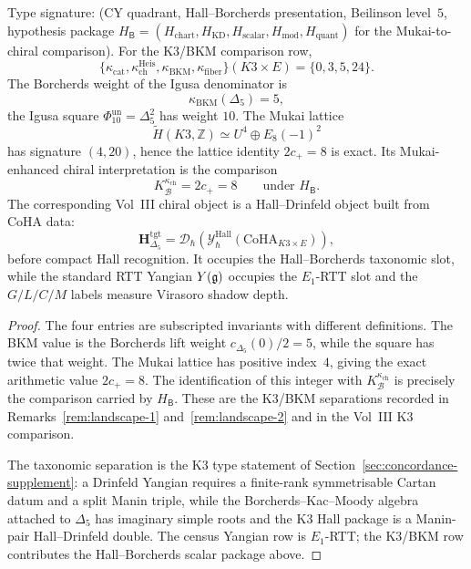\begin{proposition}
\label{prop:uc-K3-BKM-scalar-separation}
\ClaimStatusConditional
Type signature: \textup{(}CY quadrant, Hall--Borcherds presentation,
Beilinson level~$5$, hypothesis package
$H_{\mathsf B}=(H_{\mathrm{chart}},H_{\mathrm{KD}},H_{\mathrm{scalar}},
H_{\mathrm{mod}},H_{\mathrm{quant}})$ for the Mukai-to-chiral
comparison\textup{)}.
For the K3/BKM comparison row,
\[
\{\kappa_{\mathrm{cat}},
\kappa_{\mathrm{ch}}^{\mathrm{Heis}},
\kappa_{\mathrm{BKM}},
\kappa_{\mathrm{fiber}}\}(K3\times E)
=\{0,3,5,24\}.
\]
The Borcherds weight of the Igusa denominator is
\[
 \kappa_{\mathrm{BKM}}(\Delta_5)=5,
\]
the Igusa square $\Phi_{10}^{\mathrm{un}}=\Delta_5^2$ has weight
$10$.  The Mukai lattice
\[
\widetilde H(K3,\mathbb Z)\simeq U^4\oplus E_8(-1)^2
\]
has signature $(4,20)$, hence the lattice identity $2c_+=8$ is exact.
Its Mukai-enhanced chiral interpretation is the
\ClaimStatusConjectured{} comparison
\[
 K^{\kappa_{\mathrm{ch}}}_{\mathcal B}=2c_+=8
 \qquad\text{under }H_{\mathsf B}.
\]
The corresponding Vol~III chiral object is a Hall--Drinfeld object
built from CoHA data:
\[
 \mathbf H_{\Delta_5}^{\mathrm{tgt}}
 =
 \mathcal D_\hbar\!\left(
 \mathcal Y^{\mathrm{Hall}}_\hbar(\mathrm{CoHA}_{K3\times E})
 \right),
\]
before compact Hall recognition. It occupies the Hall--Borcherds
taxonomic slot, while the standard RTT Yangian $Y(\mathfrak{g})$ occupies the
$E_1$-RTT slot and the $G/L/C/M$ labels measure Virasoro shadow depth.
\end{proposition}

\begin{proof}
The four entries are subscripted invariants with different
definitions. The BKM value is the Borcherds lift weight
$c_{\Delta_5}(0)/2=5$, while the square has twice that weight. The
Mukai lattice has positive index~$4$, giving the exact arithmetic value
$2c_+=8$.  The identification of this integer with
$K^{\kappa_{\mathrm{ch}}}_{\mathcal B}$ is precisely the comparison
carried by $H_{\mathsf B}$.  These are the K3/BKM separations recorded in
Remarks~\ref{rem:landscape-1} and~\ref{rem:landscape-2} and in the
Vol~III K3 comparison.

The taxonomic separation is the K3 type statement of
Section~\ref{sec:concordance-supplement}: a Drinfeld Yangian requires a
finite-rank symmetrisable Cartan datum and a split Manin triple, while
the Borcherds--Kac--Moody algebra attached to $\Delta_5$ has imaginary
simple roots and the K3 Hall package is a Manin-pair Hall--Drinfeld
double. The census Yangian row is $E_1$-RTT; the K3/BKM row contributes
the Hall--Borcherds scalar package above.
\end{proof}

